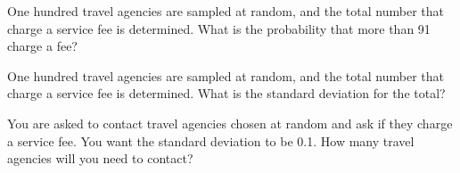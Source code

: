 \begin{problem}
\begin{subproblem}
  \item One hundred travel agencies are sampled at random, and the
    total number that charge a service fee is determined. What is the
    probability that more than 91 charge a fee?

    \vfill

  \item One hundred travel agencies are sampled at random, and the
    total number that charge a service fee is determined. What is the
    standard deviation for the total?

    \vfill

  \item You are asked to contact travel agencies chosen at random and
    ask if they charge a service fee. You want the standard deviation
    to be 0.1. How many travel agencies will you need to contact?

    \vfill

  \end{subproblem}



\end{problem}
